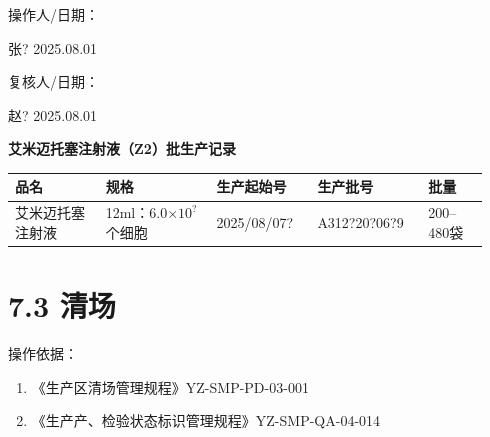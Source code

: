 \documentclass[UTF8,10pt,a4paper,fontset=fandol]{ctexart}
\newcommand{\fieldvalue}[1]{#1}
\newcommand{\handwritten}[1]{#1}
\begin{document}
\vspace{0.5em}

操作人/日期：

\fieldvalue{\handwritten{张?}}
\quad
\fieldvalue{\handwritten{2025.08.01}}

\hfill
复核人/日期：

\fieldvalue{\handwritten{赵?}}
\quad
\fieldvalue{\handwritten{2025.08.01}}

\newpage

\begin{center}
\textbf{艾米迈托塞注射液（Z2）批生产记录}
\end{center}

\noindent
\begin{tabular}{|p{0.18\linewidth}|p{0.22\linewidth}|p{0.20\linewidth}|p{0.22\linewidth}|p{0.12\linewidth}|}
\hline
品名 & 规格 & 生产起始号 & 生产批号 & 批量 \\
\hline
\fieldvalue{艾米迈托塞注射液} &
\fieldvalue{12ml：6.0$\times 10^{?}$个细胞} &
\fieldvalue{\handwritten{2025/08/07?}} &
\fieldvalue{\handwritten{A312?20?06?9}} &
\fieldvalue{200--480袋} \\
\hline
\end{tabular}

\section*{7.3 清场}

\noindent 操作依据：

\begin{enumerate}
\item 《生产区清场管理规程》\hfill YZ-SMP-PD-03-001
\item 《生产产、检验状态标识管理规程》\hfill YZ-SMP-QA-04-014
\end{enumerate}
\end{document}
